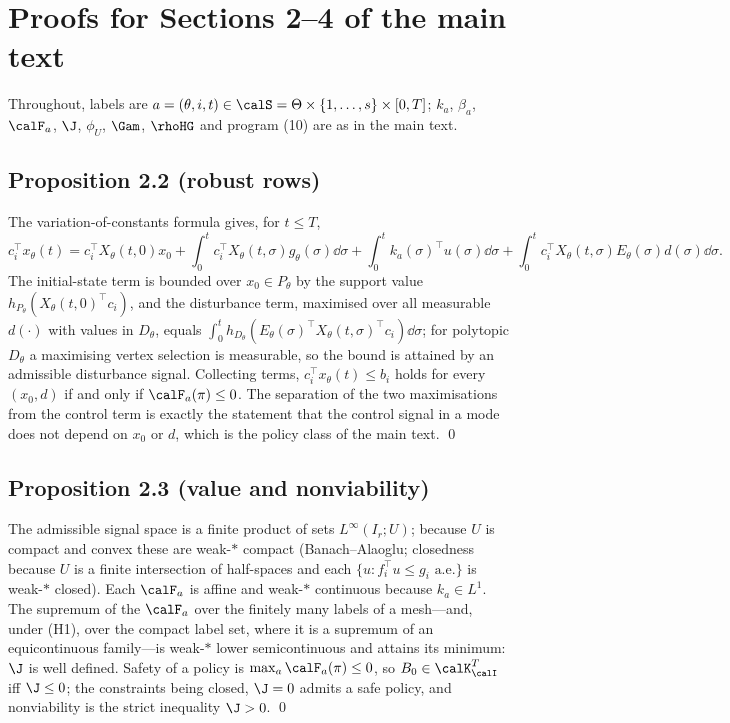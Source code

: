 \section{Proofs for Sections 2--4 of the main text}\label{S:proofs}

Throughout, labels are $a=(\theta,i,t)\in\calS=\Theta\times\{1,\dots,s\}\times[0,T]$; $k_a$, $\beta_a$, $\calF_a$, $\J$, $\phi_U$, $\Gam$, $\rhoHG$ and program (10) are as in the main text.

\subsection{Proposition 2.2 (robust rows)}
The variation-of-constants formula gives, for $t\le T$,
\[
c_i^\top x_\theta(t)=c_i^\top X_\theta(t,0)x_0+\int_0^tc_i^\top X_\theta(t,\sigma)g_\theta(\sigma)\dd\sigma+\int_0^tk_a(\sigma)^\top u(\sigma)\dd\sigma+\int_0^tc_i^\top X_\theta(t,\sigma)E_\theta(\sigma)d(\sigma)\dd\sigma .
\]
The initial-state term is bounded over $x_0\in P_\theta$ by the support value $h_{P_\theta}(X_\theta(t,0)^\top c_i)$, and the disturbance term, maximised over all measurable $d(\cdot)$ with values in $D_\theta$, equals $\int_0^th_{D_\theta}(E_\theta(\sigma)^\top X_\theta(t,\sigma)^\top c_i)\dd\sigma$; for polytopic $D_\theta$ a maximising vertex selection is measurable, so the bound is attained by an admissible disturbance signal. Collecting terms, $c_i^\top x_\theta(t)\le b_i$ holds for every $(x_0,d)$ if and only if $\calF_a(\pi)\le0$. The separation of the two maximisations from the control term is exactly the statement that the control signal in a mode does not depend on $x_0$ or $d$, which is the policy class of the main text. \qed

\subsection{Proposition 2.3 (value and nonviability)}
The admissible signal space is a finite product of sets $L^\infty(I_r;U)$; because $U$ is compact and convex these are weak-$\ast$ compact (Banach--Alaoglu; closedness because $U$ is a finite intersection of half-spaces and each $\{u:f_i^\top u\le g_i\text{ a.e.}\}$ is weak-$\ast$ closed). Each $\calF_a$ is affine and weak-$\ast$ continuous because $k_a\in L^1$. The supremum of the $\calF_a$ over the finitely many labels of a mesh---and, under (H1), over the compact label set, where it is a supremum of an equicontinuous family---is weak-$\ast$ lower semicontinuous and attains its minimum: $\J$ is well defined. Safety of a policy is $\max_a\calF_a(\pi)\le0$, so $B_0\in\calK^T_\calI$ iff $\J\le0$; the constraints being closed, $\J=0$ admits a safe policy, and nonviability is the strict inequality $\J>0$. \qed

